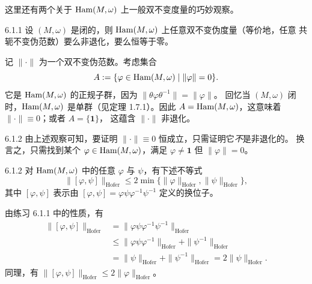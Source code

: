 
这里还有两个关于 $\operatorname{Ham}(M,\omega)$ 上一般双不变度量的巧妙观察。

\begin{wprop}{6.1.1}
  设 $(M,\omega)$ 是闭的，则 $\operatorname{Ham}(M,\omega)$ 上任意双不变伪度量（等价地，任意
  共轭不变伪范数）要么非退化，要么恒等于零。
\end{wprop}

\begin{wproof}
  记 $\|\cdot\|$ 为一个双不变伪范数。考虑集合
  \[
    A:=\{\varphi\in\operatorname{Ham}(M,\omega)\mid\|\varphi\|=0\}.
  \]
  它是 $\operatorname{Ham}(M,\omega)$ 的正规子群，因为 $\|\theta\varphi\theta^{-1}\|=\|\varphi\|$。
  回忆当 $(M,\omega)$ 闭时，$\operatorname{Ham}(M,\omega)$ 是单群（见定理 1.7.1）。因此
  $A=\operatorname{Ham}(M,\omega)$，这意味着 $\|\cdot\|\equiv 0$；或者 $A=\{\mathbf{1}\}$，
  这蕴含 $\|\cdot\|$ 非退化。
\end{wproof}

\begin{wrem}{6.1.2}
  由上述观察可知，要证明 $\|\cdot\|\equiv 0$ 恒成立，只需证明它\emph{不}是非退化的。
  换言之，只需找到某个 $\varphi\in\operatorname{Ham}(M,\omega)$，满足 $\varphi\ne\mathbf{1}$ 但
  $\|\varphi\|=0$。
\end{wrem}

\begin{wprop}{6.1.2}
  对 $\operatorname{Ham}(M,\omega)$ 中的任意 $\varphi$ 与 $\psi$，有下述不等式
  \[
    \|[\varphi,\psi]\|_{\mathrm{Hofer}}
    \le 2\min\{\|\varphi\|_{\mathrm{Hofer}},\|\psi\|_{\mathrm{Hofer}}\},
  \]
  其中 $[\varphi,\psi]$ 表示由 $[\varphi,\psi]=\varphi\psi\varphi^{-1}\psi^{-1}$
  定义的换位子。
\end{wprop}

\begin{wproof}
  由练习 6.1.1 中的性质，有
  \begin{align*}
    \|[\varphi,\psi]\|_{\mathrm{Hofer}}
    &=\|\varphi\psi\varphi^{-1}\psi^{-1}\|_{\mathrm{Hofer}}\\
    &\le\|\varphi\psi\varphi^{-1}\|_{\mathrm{Hofer}}+\|\psi^{-1}\|_{\mathrm{Hofer}}\\
    &=\|\psi\|_{\mathrm{Hofer}}+\|\psi^{-1}\|_{\mathrm{Hofer}}
      =2\|\psi\|_{\mathrm{Hofer}}.
  \end{align*}
  同理，有 $\|[\varphi,\psi]\|_{\mathrm{Hofer}}\le 2\|\varphi\|_{\mathrm{Hofer}}$。
\end{wproof}

